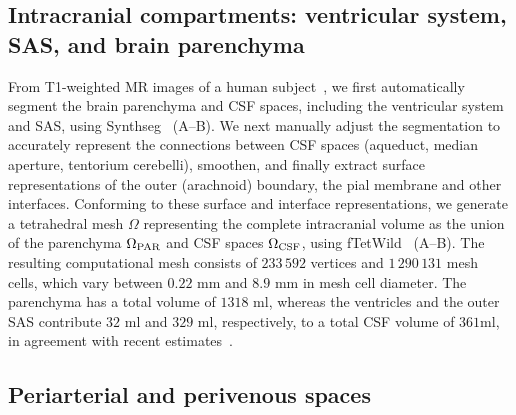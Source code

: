 \documentclass[fleqn,10pt]{wlscirep}
\begin{document}
\subsection*{Intracranial compartments: ventricular system, SAS, and brain parenchyma}

From T1-weighted MR images of a human subject~\cite{hodneland2019new},
we first automatically segment the brain parenchyma and CSF spaces,
including the ventricular system and SAS, using
Synthseg~\cite{billot2023robust,billot2023synthseg}
(A--B). We next manually adjust the segmentation to
accurately represent the connections between CSF spaces (aqueduct,
median aperture, tentorium cerebelli), smoothen, and finally extract
surface representations of the outer (arachnoid) boundary, the pial
membrane and other interfaces. Conforming to these surface and
interface representations, we generate a tetrahedral mesh $\Omega$
representing the complete intracranial volume as the union of the
parenchyma $\Omega_{\rm PAR}$ and CSF spaces $\Omega_{\rm CSF}$, using
fTetWild~\cite{hu2020fast} (A--B). The resulting
computational mesh consists of $233\,592$ vertices and $1\,290\,131$
mesh cells, which vary between $0.22$ mm and $8.9$ mm in mesh cell
diameter. The parenchyma has a total volume of $1318$ ml, whereas the
ventricles and the outer SAS contribute $32$ ml and $329$ ml,
respectively, to a total CSF volume of $361$ml, in agreement with
recent estimates~\cite{hladky2024regulation}.



\subsection*{Periarterial and perivenous spaces}
\end{document}
